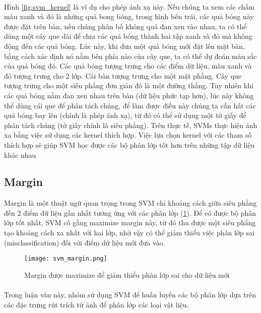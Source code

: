 \paragraph*{}
Hình \ref{fig:svm_kernel} là ví dụ cho phép ánh xạ này. Nếu chúng ta xem các chấm màu xanh và đỏ là những quả bong bóng, trong hình bên trái, các quả bóng này được đặt trên bàn, nếu chúng phân bố không quá đan xen vào nhau, ta có thể dùng một cây que dài để chia các quả bóng thành hai tập xanh và đỏ mà không động đến các quả bóng. Lúc này, khi đưa một quả bóng mới đặt lên mặt bàn, bằng cách xác định nó nằm bên phía nào của cây que, ta có thể dự đoán màu sắc của quả bóng đó. Các quả bóng tượng trưng cho các điểm dữ liệu, màu xanh và đỏ tượng trưng cho 2 lớp. Cái bàn tượng trưng cho một mặt phẳng. Cây que tượng trưng cho một siêu phẳng đơn giản đó là một đường thẳng. Tuy nhiên khi các quả bóng nằm đan xen nhau trên bàn (dữ liệu phức tạp hơn), lúc này không thể dùng cái que để phân tách chúng, để làm được điều này chúng ta cần hất các quả bóng bay lên (chính là phép ánh xạ), từ đó có thể sử dụng một tờ giấy để phân tách chúng (tờ giấy chính là siêu phẳng). Trên thực tế, SVMs thực hiện ánh xạ bằng việc sử dụng các kernel thích hợp. Việc lựa chọn kernel với các tham số thích hợp sẽ giúp SVM học được các bộ phân lớp tốt hơn trên những tập dữ liệu khác nhau

\subsection*{Margin}
Margin là một thuật ngữ quan trọng trong SVM chỉ khoảng cách giữa siêu phẳng đến 2 điểm dữ liệu gần nhất tương ứng với các phân lớp (\ref{fig:svm_margin}). Để có được bộ phân lớp tốt nhất, SVM cố gắng maximize margin này, từ đó thu được một siêu phẳng tạo khoảng cách xa nhất với hai lớp, nhờ vậy có thể giảm thiểu việc phân lớp sai (misclassification) đối với điểm dữ liệu mới đưa vào.

\begin{figure}[h!]
	\centering
	\captionsetup{width=0.8\textwidth}
	\texttt{[image: svm\_margin.png]}
	\caption{Margin được maximize để giảm thiểu phân lớp sai cho dữ liệu mới}
    \label{fig:svm_margin}
\end{figure}

\paragraph*{}
Trong luận văn này, nhóm sử dụng SVM để huấn luyến các bộ phân lớp dựa trên các đặc trưng rút trích từ ảnh để phân lớp các loại vật liệu.


